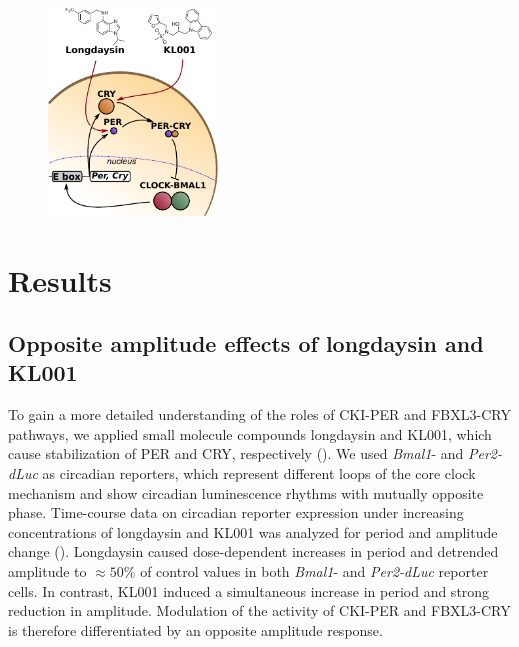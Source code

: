 \begin{figure}[tbp]
  \centering
  \includegraphics[width=0.4\textwidth]{chap4/figures/fig1_schem.pdf}
  \label{fig:4-1a}
\end{figure}

\section{Results}

\subsection{Opposite amplitude effects of longdaysin and KL001}
To gain a more detailed understanding of the roles of CKI-PER and FBXL3-CRY pathways, we applied small molecule compounds longdaysin and KL001, which cause stabilization of PER and CRY, respectively \cite{Hirota2010, Hirota2012} (). 
We used {\it Bmal1}- and {\it Per2-dLuc} as circadian reporters, which represent different loops of the core clock mechanism and show circadian luminescence rhythms with mutually opposite phase. 
Time-course data on circadian reporter expression under increasing concentrations of longdaysin and KL001 \cite{Hirota2012} was analyzed for period and amplitude change ().
Longdaysin caused dose-dependent increases in period and detrended amplitude to $\approx 50\%$ of control values in both {\it Bmal1}- and {\it Per2-dLuc} reporter cells. 
In contrast, KL001 induced a simultaneous increase in period and strong reduction in amplitude. 
Modulation of the activity of CKI-PER and FBXL3-CRY is therefore differentiated by an opposite amplitude response.

